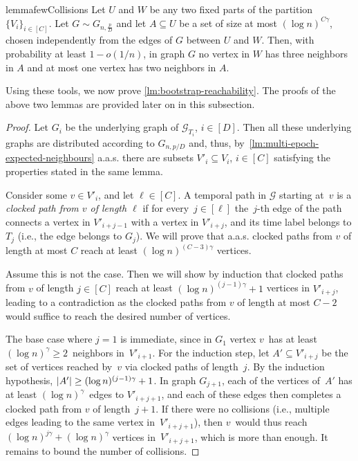 \documentclass[a4paper,11pt]{article}
\makeatletter
\theoremstyle{definition}
\theoremstyle{plain}
\newcommand{\G}{\mathcal G}
\newcommand{\aas}{a.a.s.\@\xspace}
\DeclarePairedDelimiter{\abs}{\lvert}{\rvert}
\makeatother
\begin{document}
\begin{restatable}{lemma}{fewCollisions}
	\label{lm:few-collisions}
	Let $U$ and $W$ be any two fixed parts of the partition $\{ V_i \}_{i \in [C]}$.
	Let $G \sim G_{n, \frac{p}{D}}$ and let $A \subseteq U$ be a set of size 
	at most $(\log n)^{C\gamma}$, chosen independently from the edges of $G$ between $U$ and $W$.
	Then, with probability at least $1-o(1/n)$, in graph $G$ no vertex in $W$ has three neighbors in $A$
	and at most one vertex has two neighbors in $A$.
\end{restatable}


Using these tools, we now prove \cref{lm:bootstrap-reachability}. The proofs of the above two lemmas are provided later on in this subsection.

\bootstrapReachability*
\begin{proof}
	Let $G_i$ be the underlying graph of $\G_{T_i}$, $i \in [D]$. Then all these underlying graphs 
	are distributed according to $G_{n,p/D}$ and, thus, by~\cref{lm:multi-epoch-expected-neighbours} \aas there are subsets $V'_i \subseteq V_i$, $i \in [C]$ satisfying the properties stated in the same lemma.

	
	Consider some $v\in V'_i$, and let $\ell \in [C]$.
	A temporal path in $\G$ starting at~$v$ is a \emph{clocked path from $v$ of length $\ell$}
	if for every~$j \in [\ell]$ the~$j$-th edge of the path 
	connects a vertex in $V'_{i+j-1}$ with a vertex in $V'_{i+j}$,
	and its time label belongs to $T_j$ (i.e., the edge belongs to $G_j$).
	We will prove that \aas clocked paths from $v$ of length at most $C$ reach at least 
	$(\log n)^{(C-3)\gamma}$ vertices.
	
	Assume this is not the case.
	Then we will show by induction that clocked paths from $v$ of length $j \in [C]$ reach at least $(\log n)^{(j-1)\gamma} +1$ vertices in $V'_{i+j}$, leading to a contradiction as the clocked paths from $v$ of length at most $C-2$ would suffice to reach the desired number of vertices.
	
	The base case where $j=1$ is immediate, since in $G_1$ vertex $v$~has at least $(\log n)^\gamma \geq 2$~neighbors in~$V'_{i+1}$.
	For the induction step, let $A'\subseteq V'_{i+j}$ be the set of vertices reached by~$v$ via clocked paths of length~$j$.
	By the induction hypothesis, $\abs{A'} \geq (\log n)^{(j-1)\gamma}+1$.
	In graph $G_{j+1}$, each of the vertices of~$A'$ has at least $(\log n)^\gamma$~edges to $V'_{i+j+1}$,
	and each of these edges then completes a clocked path from $v$ of length~$j+1$.
	If there were no collisions (i.e., multiple edges leading to the same vertex in~$V'_{i+j+1}$),
	then $v$~would thus reach $(\log n)^{j\gamma}+(\log n)^\gamma$ 
	vertices in~$V'_{i+j+1}$, which is more than enough. It remains to bound the number of collisions.
	

\end{proof}
\end{document}
